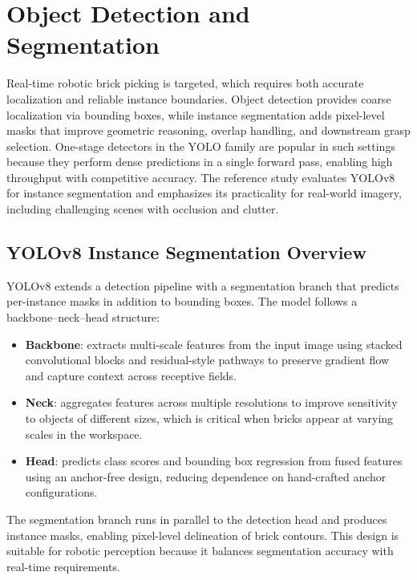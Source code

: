 \section{Object Detection and Segmentation}
\label{sec:ch2_detection}

Real-time robotic brick picking is targeted, which requires both accurate localization and reliable instance boundaries. Object detection provides coarse localization via bounding boxes, while instance segmentation adds pixel-level masks that improve geometric reasoning, overlap handling, and downstream grasp selection. One-stage detectors in the YOLO family are popular in such settings because they perform dense predictions in a single forward pass, enabling high throughput with competitive accuracy. The reference study evaluates YOLOv8 for instance segmentation and emphasizes its practicality for real-world imagery, including challenging scenes with occlusion and clutter. \cite{sapkota2024yolov8v11}

\subsection{YOLOv8 Instance Segmentation Overview}
YOLOv8 extends a detection pipeline with a segmentation branch that predicts per-instance masks in addition to bounding boxes. The model follows a backbone--neck--head structure:
\begin{itemize}
    \item \textbf{Backbone}: extracts multi-scale features from the input image using stacked convolutional blocks and residual-style pathways to preserve gradient flow and capture context across receptive fields.
    \item \textbf{Neck}: aggregates features across multiple resolutions to improve sensitivity to objects of different sizes, which is critical when bricks appear at varying scales in the workspace.
    \item \textbf{Head}: predicts class scores and bounding box regression from fused features using an anchor-free design, reducing dependence on hand-crafted anchor configurations. \cite{sapkota2024yolov8v11}
\end{itemize}
The segmentation branch runs in parallel to the detection head and produces instance masks, enabling pixel-level delineation of brick contours. This design is suitable for robotic perception because it balances segmentation accuracy with real-time requirements. \cite{sapkota2024yolov8v11}

